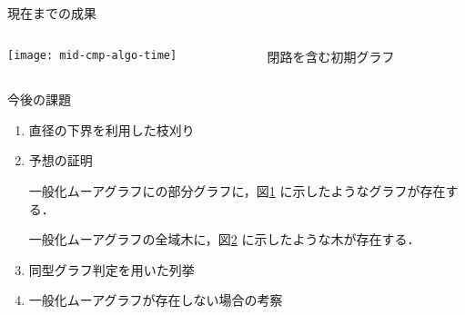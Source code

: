\begin{frame}{現在までの成果}
  \begin{columns}
    \begin{column}{.6\textwidth}
      \centering
      \texttt{[image: mid-cmp-algo-time]}
      \label{fig:result}
    \end{column}
    \begin{column}{.4\textwidth}
      \centering
      \begin{figure}
        \centering
        \def\svgwidth{\textwidth}
        \resizebox{!}{.3\textheight}{
          
        }
        \caption{閉路を含む初期グラフ}
        \label{fig:initial-graph-cycle}
      \end{figure}
      \vspace{-2em}
      \begin{figure}
        \def\svgwidth{\textwidth}
        \resizebox{!}{.3\textheight}{
          
        }
        \label{fig:initial-graph-stree}
      \end{figure}
    \end{column}
  \end{columns}
\end{frame}

\begin{frame}{今後の課題}
  \begin{enumerate}
  \item 直径の下界を利用した枝刈り
  \item 予想の証明
    \begin{conj}
      一般化ムーアグラフにの部分グラフに，図\ref{fig:initial-graph-cycle}
      に示したようなグラフが存在する．
    \end{conj}
    \begin{conj}
      一般化ムーアグラフの全域木に，図\ref{fig:initial-graph-stree}
      に示したような木が存在する．
    \end{conj}
  \item 同型グラフ判定を用いた列挙
  \item 一般化ムーアグラフが存在しない場合の考察
  \end{enumerate}
\end{frame}

